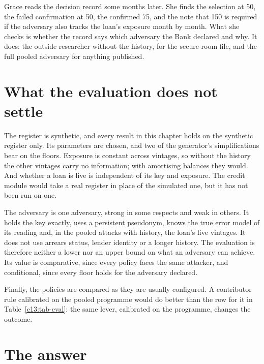 Grace reads the decision record some months later. She finds the selection at 50,
the failed confirmation at 50, the confirmed 75, and the note that 150 is required if
the adversary also tracks the loan's exposure month by month. What she checks is
whether the record says which adversary the Bank declared and why. It does: the
outside researcher without the history, for the secure-room file, and the full
pooled adversary for anything published.

\section{What the evaluation does not settle}\label{c13:sec-limits}

The register is synthetic, and every result in this chapter holds on the synthetic
register only. Its parameters are chosen, and two of the generator's simplifications
bear on the floors. Exposure is constant across vintages, so without the history the
other vintages carry no information; with amortising balances they would. And whether
a loan is live is independent of its key and exposure. The credit module would take a
real register in place of the simulated one, but it has not been run on one.

The adversary is one adversary, strong in some respects and weak in others. It holds
the key exactly, uses a persistent pseudonym, knows the true error model of its
reading and, in the pooled attacks with history, the loan's live vintages. It does not
use arrears status, lender identity or a longer history. The evaluation is therefore
neither a lower nor an upper bound on what an adversary can achieve. Its value is
comparative, since every policy faces the same attacker, and conditional, since every
floor holds for the adversary declared.

Finally, the policies are compared as they are usually configured. A contributor rule
calibrated on the pooled programme would do better than the row for it in
Table~\ref{c13:tab-eval}: the same lever, calibrated on the programme, changes the
outcome.

\section{The answer}

